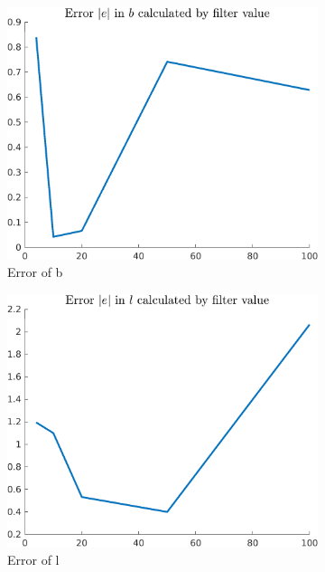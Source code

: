 \documentclass{article}
\begin{document}
\begin{figure}[H]
    \centering
    \begin{subfigure}{0.325\textwidth}
        \centering
        \includegraphics[width = \textwidth]{figures/filter_b_error.png}
        \caption{Error of b}
    \end{subfigure}
    \begin{subfigure}{0.325\textwidth}
        \centering
        \includegraphics[width = \textwidth]{figures/filter_l_error.png}
        \caption{Error of l}
    \end{subfigure}
    \begin{subfigure}{0.325\textwidth}

\end{subfigure}
\end{figure}
\end{document}
